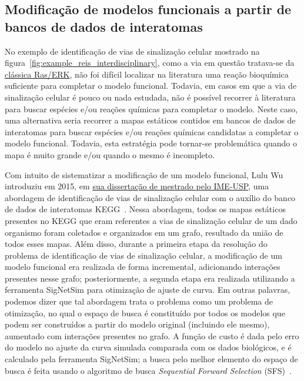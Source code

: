 \documentclass[12pt]{article}
\begin{document}
%
%
%
%



\subsection{Modificação de modelos funcionais a partir de bancos de 
dados de interatomas}

No exemplo de identificação de vias de sinalização celular mostrado na figura~\ref{fig:example_reis_interdisciplinary}, como a via em questão tratava-se da \href{https://en.wikipedia.org/wiki/MAPK/ERK\_pathway}{clássica Ras/ERK}, não foi difícil localizar na literatura uma reação bioquímica suficiente para completar o modelo funcional. Todavia, em casos em que a via de sinalização celular é pouco ou nada estudada, não é possível recorrer à literatura para buscar espécies e/ou reações químicas para completar o modelo. Neste caso, uma alternativa seria recorrer a mapas estáticos contidos em bancos de dados de interatomas para buscar espécies e/ou reações químicas candidatas a completar o modelo funcional. Todavia, esta estratégia pode tornar-se problemática quando o mapa é muito grande e/ou quando o mesmo é incompleto. 

Com intuito de sistematizar a modificação de um modelo funcional, Lulu Wu introduziu em 2015, em \href{http://www.teses.usp.br/teses/disponiveis/45/45134/tde-22082015-085947/pt-br.php}{sua dissertação de mestrado pelo IME-USP}, uma abordagem de identificação de
vias de sinalização celular com o auxílio do banco de dados de interatomas KEGG~\cite{Wu2015metodo}. Nessa abordagem, todos os mapas estáticos presentes no KEGG que eram referentes a vias de sinalização celular de um dado organismo foram coletados e organizados em um grafo, resultado da união de todos esses mapas. Além disso, durante a primeira etapa da resolução do problema de identificação de vias de sinalização celular, a modificação de um modelo funcional era realizada de forma incremental, adicionando interações presentes nesse grafo; posteriormente, a segunda etapa era realizada utilizando a ferramenta SigNetSim para otimização de ajuste de curva. Em outras palavras, podemos dizer que tal abordagem trata o problema como um problema de otimização, no qual o espaço de busca é constituído por todos os modelos que podem ser construídos a  partir do modelo original (incluindo ele mesmo), aumentado com interações presentes no grafo. A função de custo é dada pelo erro do modelo no ajuste da curva simulada comparada com os dados biológicos, e é calculado pela ferramenta SigNetSim; a busca pelo melhor elemento do espaço de busca é feita usando o algoritmo de busca {\it Sequential Forward Selection} (SFS)~\cite{Whitney:1971}.
\end{document}
